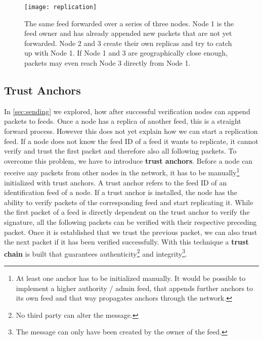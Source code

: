\begin{figure}
\centering
\texttt{[image: replication]}
\caption{The same feed forwarded over a series of three nodes. Node 1 is the feed owner and has already appended new packets that are not yet forwarded. Node 2 and 3 create their own replicas and try to catch up with Node 1. If Node 1 and 3 are geographically close enough, packets may even reach Node 3 directly from Node 1.}
\label{fig:replication}
\end{figure}

\subsection{Trust Anchors}
\label{sec:anchor}
In \cref{sec:sending} we explored, how after successful verification nodes can append packets to feeds. Once a node has a replica of another feed, this is a straight forward process. However this does not yet explain how we can start a replication feed. If a node does not know the feed ID of a feed it wants to replicate, it cannot verify and trust the first packet and therefore also all following packets. To overcome this problem, we have to introduce \textbf{trust anchors}. Before a node can receive any packets from other nodes in the network, it has to be manually\footnote{At least one anchor has to be initialized manually. It would be possible to implement a higher authority / admin feed, that appends further anchors to its own feed and that way propagates anchors through the network.} initialized with trust anchors. A trust anchor refers to the feed ID of an identification feed of a node. If a trust anchor is installed, the node has the ability to verify packets of the corresponding feed and start replicating it. While the first packet of a feed is directly dependent on the trust anchor to verify the signature, all the following packets can be verified with their respective preceding packet. Once it is established that we trust the previous packet, we can also trust the next packet if it has been verified successfully. With this technique a \textbf{trust chain} is built that guarantees authenticity\footnote{No third party can alter the message.} and integrity\footnote{The message can only have been created by the owner of the feed.}.~\cite{tinySSB}

